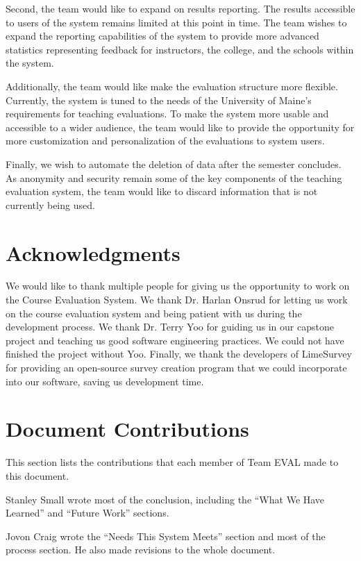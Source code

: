 \documentclass{article}
\begin{document}
Second, the team would like to expand on results reporting. The results accessible to users of the system remains limited at this point in time. The team wishes to expand the reporting capabilities of the system to provide more advanced statistics representing feedback for instructors, the college, and the schools within the system. 

Additionally, the team would like make the evaluation structure more flexible. Currently, the system is tuned to the needs of the University of Maine's requirements for teaching evaluations. To make the system more usable and accessible to a wider audience, the team would like to provide the opportunity for more customization and personalization of the evaluations to system users. 

Finally, we wish to automate the deletion of data after the semester concludes. As anonymity and security remain some of the key components of the teaching evaluation system, the team would like to discard information that is not currently being used. 

\section{Acknowledgments}

We would like to thank multiple people for giving us the opportunity to work on the Course Evaluation System. We thank Dr. Harlan Onsrud for letting us work on the course evaluation system and being patient with us during the development process. We thank Dr. Terry Yoo for guiding us in our capstone project and teaching us good software engineering practices. We could not have finished the project without Yoo. Finally, we thank the developers of LimeSurvey for providing an open-source survey creation program that we could incorporate into our software, saving us development time.

\newpage
\appendix

\section{Document Contributions}

This section lists the contributions that each member of Team EVAL made to this document.

\medskip

Stanley Small wrote most of the conclusion, including the ``What We Have Learned'' and ``Future Work'' sections.

Jovon Craig wrote the ``Needs This System Meets'' section and most of the process section. He also made revisions to the whole document.
\end{document}
